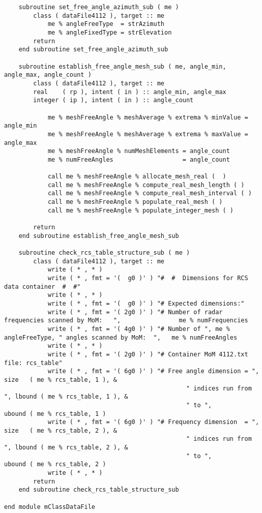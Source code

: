 {{\begin{lstlisting}
    subroutine set_free_angle_azimuth_sub ( me )
        class ( dataFile4112 ), target :: me
            me % angleFreeType  = strAzimuth
            me % angleFixedType = strElevation
        return
    end subroutine set_free_angle_azimuth_sub

    subroutine establish_free_angle_mesh_sub ( me, angle_min, angle_max, angle_count )
        class ( dataFile4112 ), target :: me
        real    ( rp ), intent ( in ) :: angle_min, angle_max
        integer ( ip ), intent ( in ) :: angle_count

            me % meshFreeAngle % meshAverage % extrema % minValue = angle_min
            me % meshFreeAngle % meshAverage % extrema % maxValue = angle_max
            me % meshFreeAngle % numMeshElements = angle_count
            me % numFreeAngles                   = angle_count

            call me % meshFreeAngle % allocate_mesh_real (  )
            call me % meshFreeAngle % compute_real_mesh_length ( )
            call me % meshFreeAngle % compute_real_mesh_interval ( )
            call me % meshFreeAngle % populate_real_mesh ( )
            call me % meshFreeAngle % populate_integer_mesh ( )

        return
    end subroutine establish_free_angle_mesh_sub

    subroutine check_rcs_table_structure_sub ( me )
        class ( dataFile4112 ), target :: me
            write ( * , * )
            write ( * , fmt = '(  g0 )' ) "#  #  Dimensions for RCS data container  #  #"
            write ( * , * )
            write ( * , fmt = '(  g0 )' ) "# Expected dimensions:"
            write ( * , fmt = '( 2g0 )' ) "# Number of radar frequencies scanned by MoM:   ",                me % numFrequencies
            write ( * , fmt = '( 4g0 )' ) "# Number of ", me % angleFreeType, " angles scanned by MoM:  ",   me % numFreeAngles
            write ( * , * )
            write ( * , fmt = '( 2g0 )' ) "# Container MoM 4112.txt file: rcs_table"
            write ( * , fmt = '( 6g0 )' ) "# Free angle dimension = ",  size   ( me % rcs_table, 1 ), &
                                                  " indices run from ", lbound ( me % rcs_table, 1 ), &
                                                  " to ",               ubound ( me % rcs_table, 1 )
            write ( * , fmt = '( 6g0 )' ) "# Frequency dimension  = ",  size   ( me % rcs_table, 2 ), &
                                                  " indices run from ", lbound ( me % rcs_table, 2 ), &
                                                  " to ",               ubound ( me % rcs_table, 2 )
            write ( * , * )
        return
    end subroutine check_rcs_table_structure_sub

end module mClassDataFile
\end{lstlisting}
}}

\endinput  %

